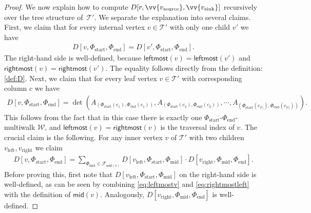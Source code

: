 \documentclass[10pt,a4paper]{article}
\numberwithin{equation}{section}
\theoremstyle{definition}
\newcommand{\CT}{\mathcal{T}}
\newcommand{\CF}{\mathcal{F}}
\newcommand{\CW}{\mathcal{W}}
\begin{document}
\begin{proof}
We now explain how to compute $D[r, \vv{v_{\textup{source}}}, \vv{v_{\textup{sink}}}]$ recursively over the tree structure of~$\CT'$. We separate the explanation into several claims.
First, we claim that for every internal vertex $v \in \CT'$ with only one child $v'$ we have
\begin{align}\label{eq:claimonlychild}
    D[v, \Phi_\text{start}, \Phi_\text{end}] = D[v', \Phi_\text{start}, \Phi_\text{end}].
\end{align}
The right-hand side is well-defined, because $\textsf{leftmost}(v)=\textsf{leftmost}(v')$ and $\textsf{rightmost}(v)=\textsf{rightmost}(v')$. The equality follows directly from the definition: \eqref{def:D}.
Next, we claim that for every leaf vertex $v \in \CT'$ with corresponding column $c$ we have
\begin{align}\label{eq:claimleaf}
    D[v, \Phi_\text{start}, \Phi_\text{end}] = \det(A_{(\Phi_\text{start}(c_1), \Phi_\text{end}(c_1))}, A_{(\Phi_\text{start}(c_2), \Phi_\text{end}(c_2))}, \cdots, A_{(\Phi_\text{start}(c_{|c|}), \Phi_\text{end}(c_{|c|}))}).
\end{align}
This follows from the fact that in this case there is exactly one $\Phi_\text{start}$-$ \Phi_\text{end}$-multiwalk $\CW$, and 
$\textsf{leftmost}(v)=\textsf{rightmost}(v)$ is the traversal index of $v$.
The crucial claim is the following.
For any inner vertex $v$ of $\CT'$ with two children $v_\text{left}, v_\text{right}$ we claim
\begin{align}\label{eq:claimdistributive}
    D[v, \Phi_\text{start}, \Phi_\text{end}] = \sum_{\Phi_\text{mid} \in \CF_{\textsf{mid}(v)}} D[v_\text{left},\Phi_\text{start}, \Phi_\text{mid}] \cdot D[v_\text{right},\Phi_\text{mid}, \Phi_\text{end}].
\end{align}
Before proving this, first note that $D[v_\text{left},\Phi_\text{start}, \Phi_\text{mid}]$ on the right-hand side is well-defined, as can be seen by combining \eqref{eq:leftmostv} and \eqref{eq:rightmostleft} with the definition of $\textsf{mid}(v)$.
Analogously, $D[v_\text{right},\Phi_\text{mid}, \Phi_\text{end}]$ is well-defined.


\end{proof}
\end{document}
